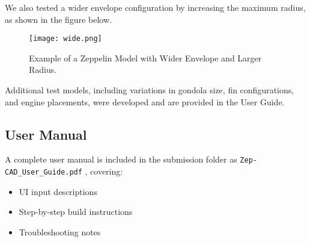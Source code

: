 \documentclass[10pt]{article}
\begin{document}
We also tested a wider envelope configuration by increasing the maximum radius, as shown in the figure below.

\begin{figure}[h!]
    \centering
    \texttt{[image: wide.png]} %
    \caption{Example of a Zeppelin Model with Wider Envelope and Larger Radius.}
\end{figure}

Additional test models, including variations in gondola size, fin configurations, and engine placements, were 
developed and are provided in the User Guide. 

\subsection*{User Manual}

A complete user manual is included in the submission folder as \texttt{Zep-CAD\_User\_Guide.pdf}
, covering:
\begin{itemize}
    \item UI input descriptions
    \item Step-by-step build instructions
    \item Troubleshooting notes
\end{itemize}
\end{document}
